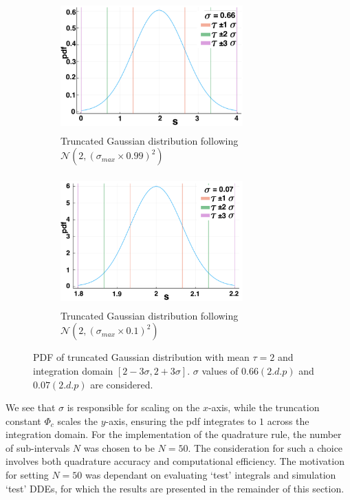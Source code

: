 \begin{figure}[H]
    \centering
    \begin{subfigure}[b]{0.45\textwidth}
        \centering
        \includegraphics[width=7cm,height=5cm]{t2sig1.png}
        \caption{Truncated Gaussian distribution following $\mathcal{N}(2,(\sigma_{max}\times0.99)^2)$}
        \label{}
    \end{subfigure}
    \hfill
    \begin{subfigure}[b]{0.45\textwidth}
        \centering
        \includegraphics[width=7cm,height=5cm]{t2sig2.png}
        \caption{Truncated Gaussian distribution following $\mathcal{N}(2,(\sigma_{max}\times0.1)^2)$}
        \label{}
    \end{subfigure}
    \caption{PDF of truncated Gaussian distribution with mean $\tau=2$ and integration domain $[2-3\sigma,2+3\sigma]$. $\sigma$ values of $0.66(2.d.p)$ and $0.07(2.d.p)$ are considered.}
    \label{fig:pdf2}
\end{figure}
We see that $\sigma$ is responsible for scaling on the $x$-axis, while the truncation constant $\Phi_c$ scales the $y$-axis, ensuring the pdf integrates to $1$ across the integration domain. For the implementation of the quadrature rule, the number of sub-intervals $N$ was chosen to be $N=50$. The consideration for such a choice involves both quadrature accuracy and computational efficiency. The motivation for setting $N=50$ was dependant on evaluating `test' integrals and simulation `test' DDEs, for which the results are presented in the remainder of this section.

